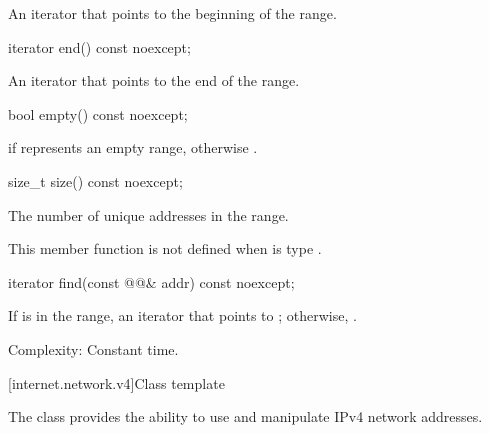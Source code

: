 \begin{itemdescr}
\pnum
\returns An iterator that points to the beginning of the range.
\end{itemdescr}

\begin{itemdecl}
iterator end() const noexcept;
\end{itemdecl}

\begin{itemdescr}
\pnum
\returns An iterator that points to the end of the range.
\end{itemdescr}

\begin{itemdecl}
bool empty() const noexcept;
\end{itemdecl}

\begin{itemdescr}
\pnum
\returns {} if  represents an empty range, otherwise .
\end{itemdescr}

\begin{itemdecl}
size_t size() const noexcept;
\end{itemdecl}

\begin{itemdescr}
\pnum
\returns The number of unique addresses in the range.

\pnum
\remarks This member function is not defined when  is type .
\end{itemdescr}

\begin{itemdecl}
iterator find(const @@& addr) const noexcept;
\end{itemdecl}

\begin{itemdescr}
\pnum
\returns If  is in the range, an iterator that points to ; otherwise, .

\pnum
Complexity: Constant time.
\end{itemdescr}



%
[internet.network.v4]{Class template }

\pnum
The class  provides the ability to use and manipulate IPv4 network addresses.

